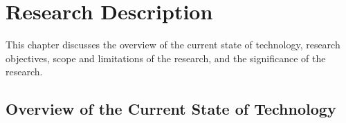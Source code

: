 %
%
%                 

\chapter{Research Description}
\label{sec:researchdesc}    %

This chapter discusses the overview of the current state of technology, research objectives, scope and limitations of the research, and the significance of the research.

\section{Overview of the Current State of Technology}
\label{sec:overview}

%
%





%
%

